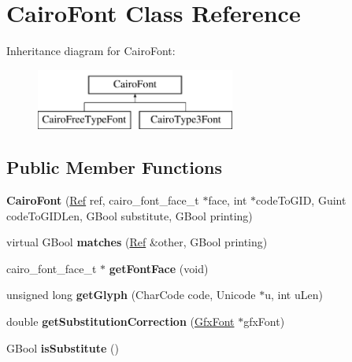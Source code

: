 \hypertarget{class_cairo_font}{}\section{Cairo\+Font Class Reference}
\label{class_cairo_font}
Inheritance diagram for Cairo\+Font\+:\begin{figure}[H]
\begin{center}
\leavevmode
\includegraphics[height=2.000000cm]{class_cairo_font}
\end{center}
\end{figure}
\subsection*{Public Member Functions}
\begin{DoxyCompactItemize}
\item 
\mbox{\label{class_cairo_font_a9e85265c527a27538157316911175fa5}} 
{\bfseries Cairo\+Font} (\hyperlink{struct_ref}{Ref} ref, cairo\+\_\+font\+\_\+face\+\_\+t $\ast$face, int $\ast$code\+To\+G\+ID, Guint code\+To\+G\+I\+D\+Len, G\+Bool substitute, G\+Bool printing)
\item 
\mbox{\label{class_cairo_font_ad742552daee61f212000c5c08c771816}} 
virtual G\+Bool {\bfseries matches} (\hyperlink{struct_ref}{Ref} \&other, G\+Bool printing)
\item 
\mbox{\label{class_cairo_font_a2ca9d5853873a5baae091b0129ec1775}} 
cairo\+\_\+font\+\_\+face\+\_\+t $\ast$ {\bfseries get\+Font\+Face} (void)
\item 
\mbox{\label{class_cairo_font_aa919011112bf8ac9a9a99d52d4d2b687}} 
unsigned long {\bfseries get\+Glyph} (Char\+Code code, Unicode $\ast$u, int u\+Len)
\item 
\mbox{\label{class_cairo_font_a680ed97f36cd0cfdf40318e3bd2a3f22}} 
double {\bfseries get\+Substitution\+Correction} (\hyperlink{class_gfx_font}{Gfx\+Font} $\ast$gfx\+Font)
\item 
\mbox{\label{class_cairo_font_a7366267076fd83edf56fc370f74cc845}} 
G\+Bool {\bfseries is\+Substitute} ()
\end{DoxyCompactItemize}
